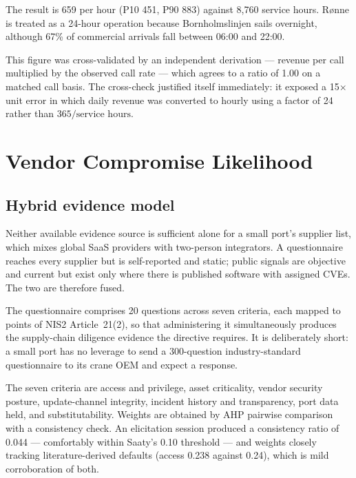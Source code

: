 \documentclass[conference]{IEEEtran}
\newcommand{\eur}{\mbox{\texteuro}}
\begin{document}
The result is \eur{}659 per hour (P10 \eur{}451, P90 \eur{}883) against 8{,}760
service hours. Rønne is treated as a 24-hour operation because Bornholmslinjen
sails overnight, although 67\% of commercial arrivals fall between 06:00 and 22:00.

This figure was cross-validated by an independent derivation --- revenue per call
multiplied by the observed call rate --- which agrees to a ratio of 1.00 on a
matched call basis. The cross-check justified itself immediately: it exposed a
15$\times$ unit error in which daily revenue was converted to hourly using a factor
of 24 rather than $365/\textrm{service hours}$.

\section{Vendor Compromise Likelihood}

\subsection{Hybrid evidence model}

Neither available evidence source is sufficient alone for a small port's supplier
list, which mixes global SaaS providers with two-person integrators. A questionnaire
reaches every supplier but is self-reported and static; public signals are objective
and current but exist only where there is published software with assigned CVEs.
The two are therefore fused.

The questionnaire comprises 20 questions across seven criteria, each mapped to
points of NIS2 Article~21(2), so that administering it simultaneously produces the
supply-chain diligence evidence the directive requires. It is deliberately short:
a small port has no leverage to send a 300-question industry-standard questionnaire
to its crane OEM and expect a response.

The seven criteria are access and privilege, asset criticality, vendor security
posture, update-channel integrity, incident history and transparency, port data
held, and substitutability. Weights are obtained by AHP pairwise comparison with a
consistency check. An elicitation session produced a consistency ratio of 0.044 ---
comfortably within Saaty's 0.10 threshold --- and weights closely tracking
literature-derived defaults (access 0.238 against 0.24), which is mild
corroboration of both.
\end{document}
